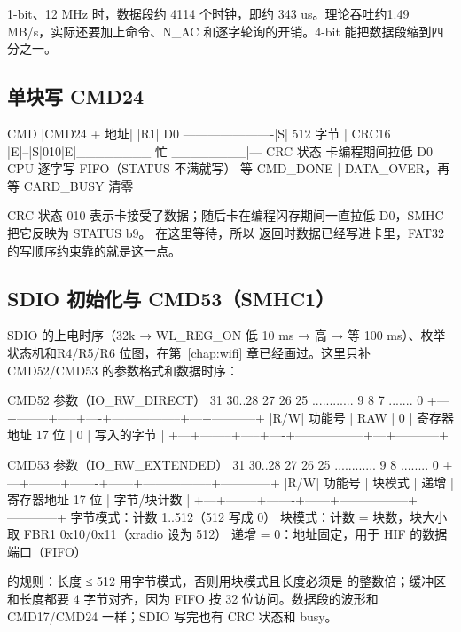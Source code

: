 1-bit、12 MHz 时，数据段约 4114 个时钟，即约 343 us。理论吞吐约1.49 MB/s，实际还要加上命令、N\_AC 和逐字轮询的开销。4-bit 能把数据段缩到四分之一。

\subsection{单块写 CMD24}

\begin{txtcode}[basicstyle=\ttfamily\scriptsize]
CMD   |CMD24 + 地址|   |R1|
D0    ----------------------|S| 512 字节 | CRC16 |E|--|S|010|E|________ 忙 ________|---
                                                     CRC 状态    卡编程期间拉低 D0
CPU   逐字写 FIFO（STATUS 不满就写）                  等 CMD_DONE | DATA_OVER，再等 CARD_BUSY 清零
\end{txtcode}

CRC 状态 010 表示卡接受了数据；随后卡在编程闪存期间一直拉低 D0，SMHC 把它反映为 STATUS b9。 在这里等待，所以 返回时数据已经写进卡里，FAT32 的写顺序约束靠的就是这一点。

\subsection{SDIO 初始化与 CMD53（SMHC1）}

SDIO 的上电时序（32k → WL\_REG\_ON 低 10 ms → 高 → 等 100 ms）、枚举状态机和R4/R5/R6 位图，在第~\ref{chap:wifi} 章已经画过。这里只补 CMD52/CMD53 的参数格式和数据时序：

\begin{txtcode}
CMD52 参数（IO_RW_DIRECT）
 31   30..28   27    26   25 ............ 9   8   7 ....... 0
+---+--------+-----+----+-----------------+---+-----------+
|R/W| 功能号  | RAW | 0  | 寄存器地址 17 位 | 0 | 写入的字节 |
+---+--------+-----+----+-----------------+---+-----------+

CMD53 参数（IO_RW_EXTENDED）
 31   30..28   27      26     25 ............ 9   8 ........ 0
+---+--------+-------+------+-----------------+------------+
|R/W| 功能号  | 块模式 | 递增 | 寄存器地址 17 位 | 字节/块计数 |
+---+--------+-------+------+-----------------+------------+
字节模式：计数 1..512（512 写成 0）
块模式：计数 = 块数，块大小取 FBR1 0x10/0x11（xradio 设为 512）
递增 = 0：地址固定，用于 HIF 的数据端口（FIFO）
\end{txtcode}

 的规则：长度 ≤ 512 用字节模式，否则用块模式且长度必须是 的整数倍；缓冲区和长度都要 4 字节对齐，因为 FIFO 按 32 位访问。数据段的波形和 CMD17/CMD24 一样；SDIO 写完也有 CRC 状态和 busy。

